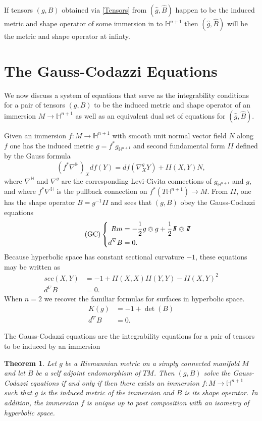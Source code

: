 \documentclass{amsart}
\newcommand{\two}{I\!\!I}
\newtheorem{thm}{Theorem}[section]
\renewcommand{\H}{\mathbb{H}}
\begin{document}
If tensors $(g,B)$ obtained via \eqref{Tensors} from $(\hat{g},\hat{B})$ happen to be the induced metric and shape operator of some immersion in to $\H^{n+1}$ then $(\hat{g},\hat{B})$ will be the metric and shape operator at infinty. 


\section{The Gauss-Codazzi Equations}
We now discuss a system of equations that serve as the integrability conditions for a pair of tensors $(g,B)$ to be the induced metric and shape operator of an immersion $M \to \H^{n+1}$ as well as an equivalent dual set of equations for $(\hat{g},\hat{B})$.

Given an immersion $f: M \to \H^{n+1}$ with smooth unit normal vector field $N$ along $f$ one has the induced metric $g = f^*g_{\H^{n+1}}$ and second fundamental form $\two$ defined by the Gauss formula
\[
(f^*\nabla^{\H})_Xdf(Y) = df(\nabla^g_XY) + \two(X,Y)N,
\]
where $\nabla^\H$ and $\nabla^g$ are the corresponding Levi-Civita connections of $g_{\H^{n+1}}$ and $g$, and where $f^*\nabla^\H$ is the pullback connection on $f^*(T\H^{n+1}) \to M$.
From $\two$, one has the shape operator $B = g^{-1}\two$ and sees that $(g,B)$ obey the Gauss-Codazzi equations
\begin{equation}
\label{GC} \tag{GC}
\left\{
\begin{aligned}
Rm &= -\frac{1}{2}g \owedge g + \frac{1}{2}\two \owedge \two \\
d^\nabla B &= 0.
\end{aligned}
\right.
\end{equation}
Because hyperbolic space has constant sectional curvature $-1$, these equations may be written as
\begin{align*}
sec(X,Y) &= -1 + \two(X,X)\two(Y,Y) - \two(X,Y)^2 \\
d^\nabla B &= 0.
\end{align*}
When $n = 2$ we recover the familiar formulas for surfaces in hyperbolic space. 
\begin{align*}
K(g) &= -1 + \det(B) \\
d^\nabla B &= 0. 
\end{align*}

The Gauss-Codazzi equations are the integrability equations for a pair of tensors to be induced by an immersion

\begin{thm}
Let $g$ be a Riemannian metric on a simply connected manifold $M$ and let $B$ be a self adjoint endomorphism of $TM$. 
Then $(g,B)$ solve the Gauss-Codazzi equations if and only if then there exists an immersion $f: M \to \H^{n+1}$ such that $g$ is the induced metric of the immersion and $B$ is its shape operator. 
In addition, the immersion $f$ is unique up to post composition with an isometry of hyperbolic space. 
\end{thm}
\end{document}
